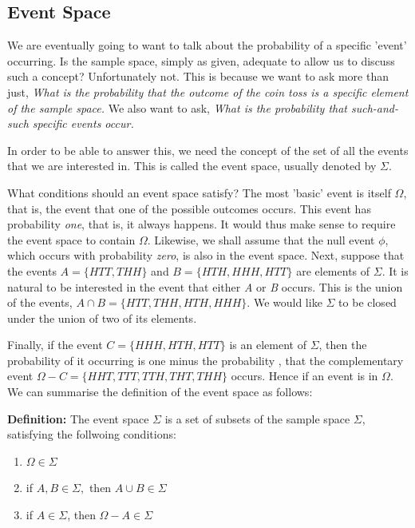 \documentclass[12pt]{article}
\begin{document}
\subsection{Event Space}

We are eventually going to want to talk about the probability of a specific 'event' occurring. Is the sample space, simply as given, adequate to allow us to discuss such a concept? Unfortunately not. This is because we want to ask more than just, \textit{What is the probability that the outcome of the coin toss is a specific element of the sample space.}
We also want to ask, \textit{What is the probability that such-and-such specific events occur.}

In order to be able to answer this, we need the concept of the set of all the events that we are interested in. This is called the event space, usually denoted by $\Sigma$.

What conditions should an event space satisfy? The most 'basic' event is itself $\Omega$, that is, the event that one of the possible outcomes occurs. This event has probability \textit{one}, that is, it always happens. It would thus make sense to require the event space to contain $\Omega$.
Likewise, we shall assume that the null event $\phi$, which occurs with probability \textit{zero}, is also in the event space. Next, suppose that the events $A = \{HTT,THH\}$ and $B=\{HTH,HHH,HTT\}$ are elements of $\Sigma$. It is natural to be interested in the event that either \textit{A} or \textit{B} occurs. This is the union of the events, $A \cap B=\{HTT,THH,HTH,HHH\}$. We would like $\Sigma$ to be closed under the union of two of its elements.

Finally, if the event $C=\{HHH,HTH,HTT\}$ is an element of $\Sigma$, then the probability of it occurring is one minus the probability , that the complementary event $\Omega-C=\{HHT,TTT,TTH,THT,THH\}$ occurs. Hence if an event is in $\Omega$. We can summarise the definition of the event space as follows:

\textbf{Definition:} The event space $\Sigma$ is a set of subsets of the sample space $\Sigma$, satisfying the follwoing conditions:

\begin{enumerate}
	\item $\Omega \in \Sigma$
	\item if $A, B \in \Sigma,$ then $A \cup B \in \Sigma$
	\item if $A \in \Sigma$, then $\Omega-A \in \Sigma$ 
\end{enumerate}
\end{document}
